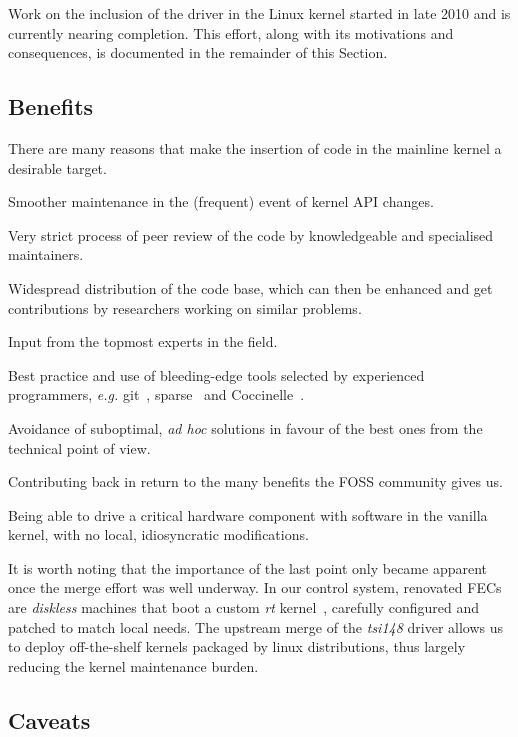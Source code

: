\documentclass{JAC2003}
\begin{document}
Work on the inclusion of the driver in the Linux kernel started in late
2010 and is currently nearing completion. This effort, along with its
motivations and consequences, is documented in the remainder of this
Section.

\subsection{Benefits}

There are many reasons that make the insertion of code in the mainline kernel
a desirable target.

\begin{Itemize}
\item Smoother maintenance in the (frequent) event of kernel API
  changes.~\cite{stable-api-nonsense}
\item Very strict process of peer review of the code by knowledgeable
    and specialised maintainers.
\item Widespread distribution of the code base, which can then be
    enhanced and get contributions by researchers working on similar
    problems.
\item Input from the topmost experts in the field.
\item Best practice and use of bleeding-edge tools selected by
    experienced programmers, \emph{e.g.} git~\cite{git}, sparse~\cite{sparse}
    and Coccinelle~\cite{coccinelle}.
\item Avoidance of suboptimal, \emph{ad hoc} solutions in favour of the
    best ones from the technical point of view.
\item Contributing back in return to the many benefits the FOSS community
    gives us.
\item Being able to drive a critical hardware component with software
    in the vanilla kernel, with no local, idiosyncratic modifications.
\end{Itemize}

It is worth noting that the importance of the last point only became
apparent once the merge effort was well underway. In our control system,
renovated FECs are \emph{diskless} machines that boot a custom \emph{rt}
kernel~\cite{linux-rt}, carefully configured and patched to match local
needs.  The upstream merge of the \emph{tsi148} driver allows us to deploy
off-the-shelf kernels packaged by linux distributions, thus largely reducing
the kernel maintenance burden.

\subsection{Caveats}
\end{document}
